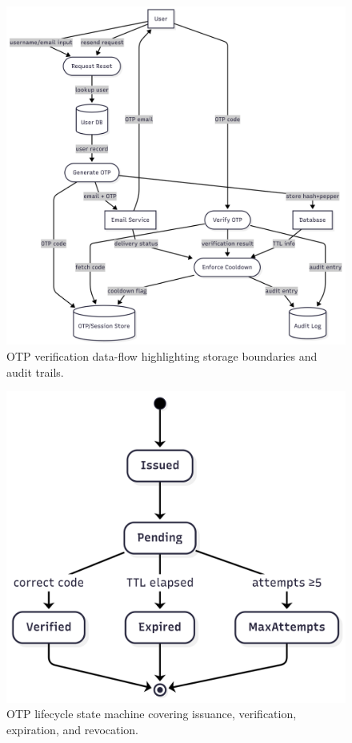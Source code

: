 \documentclass[12pt]{article}
\begin{document}
\begin{figure}[t]
  \centering
  \includegraphics[width=0.9\linewidth]{detailed_data_flow.png}
  \caption{OTP verification data-flow highlighting storage boundaries and audit trails.}
  \label{fig:dfd}
\end{figure}

\begin{figure}[t]
  \centering
  \includegraphics[width=0.85\linewidth]{otp_lifecycle_state_machine.png}
  \caption{OTP lifecycle state machine covering issuance, verification, expiration, and revocation.}
  \label{fig:otp_state}
\end{figure}
\end{document}
